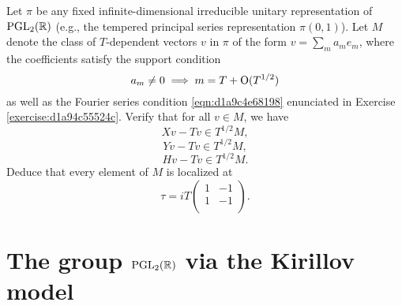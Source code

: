 \documentclass[reqno]{amsart} 
\numberwithin{equation}{section}
\begin{document}
\begin{exercise}\label{exercise:d1aa01c4e580}
  Let $\pi$ be any fixed infinite-dimensional irreducible unitary representation of $\operatorname{PGL}_2(\mathbb{R})$ (e.g., the tempered principal series representation $\pi(0,1)$).  Let $M$ denote the class of $T$-dependent vectors $v$ in $\pi$ of the form $v = \sum_m a_m e_m$, where the coefficients satisfy the support condition
  \begin{equation*}
    a_m \neq 0 \implies m = T+ \operatorname{O}(T^{1/2})
  \end{equation*}
  as well as the Fourier series condition \eqref{eqn:d1a9c4e68198} enunciated in Exercise \ref{exercise:d1a94c55524c}.  Verify that for all $v \in M$, we have
  \begin{equation*}
    X v - T v \in T^{1/2} M,
  \end{equation*}
  \begin{equation*}
    Y v - T v \in T^{1/2} M,
  \end{equation*}
  \begin{equation*}
    H v - T v \in T^{1/2} M.
  \end{equation*}
  Deduce that every element of $M$ is localized at
  \begin{equation*}
    \tau =  i T
    \begin{pmatrix}
      1 & -1 \\
      1 & -1 \\
    \end{pmatrix}.
  \end{equation*}
\end{exercise}

\section{The group $\operatorname{PGL}_2(\mathbb{R})$ via the Kirillov model}\label{sec:d1a9162e9d89}
\end{document}
